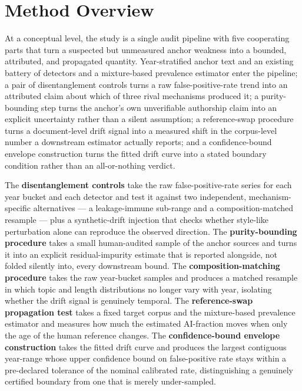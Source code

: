 \documentclass[11pt]{article}
\begin{document}
\section{Method Overview}

At a conceptual level, the study is a single audit pipeline with five cooperating parts that turn a suspected but unmeasured anchor weakness into a bounded, attributed, and propagated quantity. Year-stratified anchor text and an existing battery of detectors and a mixture-based prevalence estimator enter the pipeline; a pair of disentanglement controls turns a raw false-positive-rate trend into an attributed claim about which of three rival mechanisms produced it; a purity-bounding step turns the anchor's own unverifiable authorship claim into an explicit uncertainty rather than a silent assumption; a reference-swap procedure turns a document-level drift signal into a measured shift in the corpus-level number a downstream estimator actually reports; and a confidence-bound envelope construction turns the fitted drift curve into a stated boundary condition rather than an all-or-nothing verdict.

The \textbf{disentanglement controls} take the raw false-positive-rate series for each year bucket and each detector and test it against two independent, mechanism-specific alternatives --- a leakage-immune sub-range and a composition-matched resample --- plus a synthetic-drift injection that checks whether style-like perturbation alone can reproduce the observed direction. The \textbf{purity-bounding procedure} takes a small human-audited sample of the anchor sources and turns it into an explicit residual-impurity estimate that is reported alongside, not folded silently into, every downstream bound. The \textbf{composition-matching procedure} takes the raw year-bucket samples and produces a matched resample in which topic and length distributions no longer vary with year, isolating whether the drift signal is genuinely temporal. The \textbf{reference-swap propagation test} takes a fixed target corpus and the mixture-based prevalence estimator and measures how much the estimated AI-fraction moves when only the age of the human reference changes. The \textbf{confidence-bound envelope construction} takes the fitted drift curve and produces the largest contiguous year-range whose upper confidence bound on false-positive rate stays within a pre-declared tolerance of the nominal calibrated rate, distinguishing a genuinely certified boundary from one that is merely under-sampled.
\end{document}
